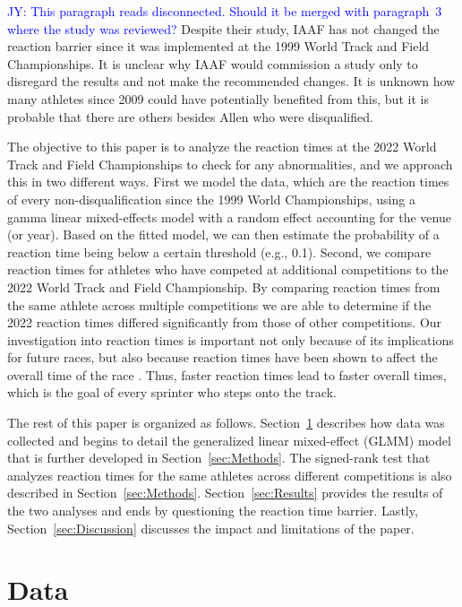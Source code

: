 \documentclass[12pt, letterpaper, titlepage]{article}
\newcommand{\jy}[1]{\textcolor{blue}{JY: #1}}
\begin{document}
\jy{This paragraph reads disconnected. Should it be merged with paragraph~3
  where the study was reviewed?}
Despite their study, IAAF has not changed the reaction barrier since it was
implemented at the 1999 World Track and Field Championships.  It is unclear
why IAAF would commission a study only to disregard the results and not
make the recommended changes.  It is unknown how many athletes since 2009 could
have potentially benefited from this, but it is probable that there are others
besides Allen who were disqualified.


The objective to this paper is to analyze the reaction times at the 2022 World 
Track and Field Championships to check for any abnormalities, and we approach
this in two different ways.  First we model the data, which are
the reaction times of every non-disqualification since the 1999 World 
Championships, using a gamma linear mixed-effects model with a random effect 
accounting for the venue (or year). 
Based on the fitted model, we can then estimate the probability of a reaction 
time being below a certain threshold (e.g., 0.1). 
Second, we compare reaction times for athletes who have competed
at additional competitions to the 2022 World Track and Field Championship.  By
comparing reaction times from the same athlete across multiple competitions we 
are able to determine if the 2022 reaction times differed significantly from 
those of other competitions.
Our investigation into reaction times is important not only because of its
implications for future races, but also because reaction times have
been shown to affect the overall time of the race \citep{delalija2008reaction}.
Thus, faster reaction times lead to faster overall times, which is the goal of
every sprinter who steps onto the track.


The rest of this paper is organized as follows. Section~\ref{sec:Data} describes 
how data was collected and begins to detail the generalized linear mixed-effect 
(GLMM) model that is further developed in Section~\ref{sec:Methods}. The 
signed-rank test that analyzes reaction times for the same athletes across
different competitions is
also described in Section~\ref{sec:Methods}.  Section~\ref{sec:Results}
 provides the results of the two analyses and ends 
by questioning the reaction time barrier.  Lastly, Section~\ref{sec:Discussion}
discusses the impact and limitations of the paper.


\section{Data} \label{sec:Data}
\end{document}

